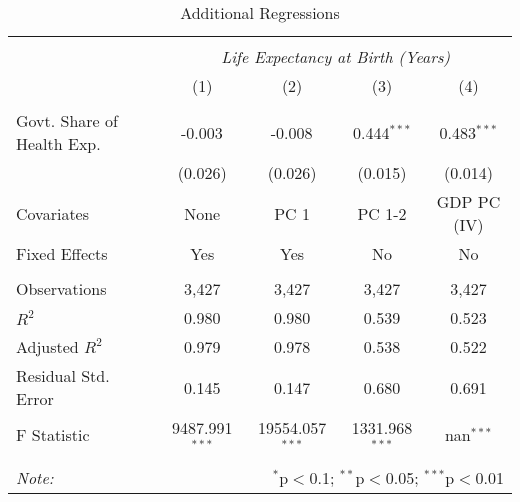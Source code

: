 \begin{table}[!htbp] \centering
  \caption{Additional Regressions \label{additional_regs}}
\begin{tabular}{@{\extracolsep{5pt}}lcccc}
\\[-1.8ex]\hline
\hline \\[-1.8ex]
& \multicolumn{4}{c}{\textit{Life Expectancy at Birth (Years)}} \
\cr \
\\[-1.8ex] & (1) & (2) & (3) & (4) \\
\hline \\[-1.8ex]
 Govt. Share of Health Exp. & -0.003$^{}$ & -0.008$^{}$ & 0.444$^{***}$ & 0.483$^{***}$ \\
  & (0.026) & (0.026) & (0.015) & (0.014) \\
 Covariates & None & PC 1 & PC 1-2 & GDP PC (IV) \\
 Fixed Effects & Yes & Yes & No & No \\
\hline \\[-1.8ex]
 Observations & 3,427 & 3,427 & 3,427 & 3,427 \\
 $R^2$ & 0.980 & 0.980 & 0.539 & 0.523 \\
 Adjusted $R^2$ & 0.979 & 0.978 & 0.538 & 0.522 \\
 Residual Std. Error & 0.145 & 0.147 & 0.680 & 0.691  \\
 F Statistic & 9487.991$^{***}$  & 19554.057$^{***}$  & 1331.968$^{***}$  & nan$^{***}$  \\
\hline
\hline \\[-1.8ex]
\textit{Note:} & \multicolumn{4}{r}{$^{*}$p$<$0.1; $^{**}$p$<$0.05; $^{***}$p$<$0.01} \\
\end{tabular}
\end{table}